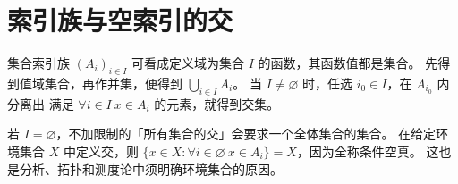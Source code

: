 \section{索引族与空索引的交}
集合索引族 \((A_i)_{i\in I}\) 可看成定义域为集合 \(I\) 的函数，其函数值都是集合。
先得到值域集合，再作并集，便得到 \(\bigcup_{i\in I}A_i\)。
当 \(I\ne\varnothing\) 时，任选 \(i_0\in I\)，在 \(A_{i_0}\) 内分离出
满足 \(\forall i\in I\ x\in A_i\) 的元素，就得到交集。

若 \(I=\varnothing\)，不加限制的「所有集合的交」会要求一个全体集合的集合。
在给定环境集合 \(X\) 中定义交，则
\(\{x\in X:\forall i\in\varnothing\ x\in A_i\}=X\)，因为全称条件空真。
这也是分析、拓扑和测度论中须明确环境集合的原因。
